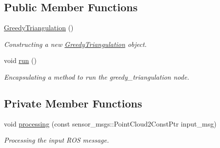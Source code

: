 \subsection*{Public Member Functions}
\begin{DoxyCompactItemize}
\item 
\hyperlink{classgreedy__triangulation__node_1_1_greedy_triangulation_ad6f4f3406728aeb60f8b3cbedb97ba90}{Greedy\+Triangulation} ()
\begin{DoxyCompactList}\small\item\em Constructing a new \hyperlink{classgreedy__triangulation__node_1_1_greedy_triangulation}{Greedy\+Triangulation} object. \end{DoxyCompactList}\item 
void \hyperlink{classgreedy__triangulation__node_1_1_greedy_triangulation_aa6c8fda7b33d62a1de3b50e46eca752f}{run} ()
\begin{DoxyCompactList}\small\item\em Encapsulating a method to run the greedy\+\_\+triangulation node. \end{DoxyCompactList}\end{DoxyCompactItemize}
\subsection*{Private Member Functions}
\begin{DoxyCompactItemize}
\item 
void \hyperlink{classgreedy__triangulation__node_1_1_greedy_triangulation_aa0be85290792f2cb7eb48a03f4a7a22b}{processing} (const sensor\+\_\+msgs\+::\+Point\+Cloud2\+Const\+Ptr input\+\_\+msg)
\begin{DoxyCompactList}\small\item\em Processing the input R\+OS message. \end{DoxyCompactList}\end{DoxyCompactItemize}
